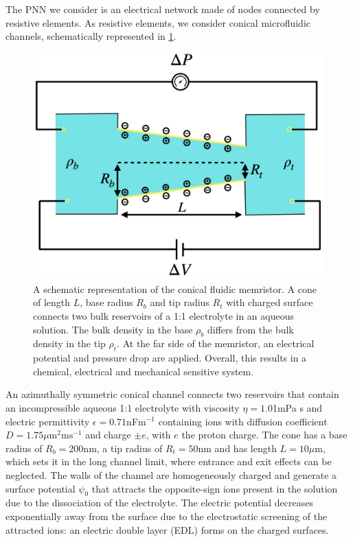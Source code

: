 \documentclass[reprint,superscriptaddress,prb,showkeys]{revtex4-2}
\begin{document}
The PNN we consider is an electrical network made of nodes connected by resistive elements. As resistive elements, we consider conical microfluidic channels, schematically represented in \cref{fig:memristor_scheme}. 
\begin{figure}[h]
    \centering
    \includegraphics[width=\columnwidth]{plots/memristor/memristor_scheme.pdf}
    \caption{A schematic representation of the conical fluidic memristor. A cone of length $L$, base radius $R_b$ and tip radius $R_t$ with charged surface connects two bulk reservoirs of a 1:1 electrolyte in an aqueous solution. The bulk density in the base $\rho_b$ differs from the bulk density in the tip $\rho_t$. At the far side of the memristor, an electrical potential and pressure drop are applied. Overall, this results in a chemical, electrical and mechanical sensitive system.}\label{fig:memristor_scheme}
\end{figure} 
An azimuthally symmetric conical channel connects two reservoirs that contain an incompressible aqueous 1:1 electrolyte with viscosity $\eta=1.0$1mPa s and electric permittivity $\epsilon = 0.71$nF$\text{m}^{-1}$ containing ions with diffusion coefficient $D = 1.75\mu \text{m}^2 \text{ms}^{-1}$ and charge $\pm e$, with $e$ the proton charge. The cone has a base radius of $R_b = 200$nm, a tip radius of $R_t=50$nm and has length $L = 10\mu$m, which sets it in the long channel limit, where entrance and exit effects can be neglected. The walls of the channel are homogeneously charged and generate a surface potential $\psi_0$ that attracts the opposite-sign ions present in the solution due to the dissociation of the electrolyte. The electric potential decreases exponentially away from the surface due to the electrostatic screening of the attracted ions: an electric double layer (EDL) forms on the charged surfaces. 
\end{document}
